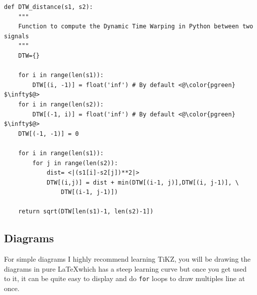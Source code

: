 \documentclass{project-logbook}
\begin{document}
\begin{lstlisting}[style=Python, linebackgroundcolor={
	\ifnum \value{lstnumber}=8 \color{orange!30} \fi
	\ifnum \value{lstnumber}=10 \color{orange!30} \fi
	\ifnum \value{lstnumber}=17 \color{orange!30}\fi
	\ifnum \value{lstnumber}=18 \color{orange!30}\fi}]
def DTW_distance(s1, s2):
	"""
	Function to compute the Dynamic Time Warping in Python between two signals
	"""
	DTW={}

	for i in range(len(s1)):
		DTW[(i, -1)] = float('inf') # By default <@\color{pgreen} $\infty$@>
	for i in range(len(s2)):
		DTW[(-1, i)] = float('inf') # By default <@\color{pgreen} $\infty$@>
	DTW[(-1, -1)] = 0

	for i in range(len(s1)):
		for j in range(len(s2)):
			dist= <|(s1[i]-s2[j])**2|>
			DTW[(i,j)] = dist + min(DTW[(i-1, j)],DTW[(i, j-1)], \
				DTW[(i-1, j-1)])

	return sqrt(DTW[len(s1)-1, len(s2)-1])
\end{lstlisting}

	\subsection{Diagrams} \label{sub:diagrams}
		\begin{HighlightedNote}{}
			For simple diagrams I highly recommend learning TiKZ, you will be drawing the diagrams in pure \LaTeX which has a steep learning curve but once you get used to it, it can be quite easy to display and do \texttt{for} loops to draw multiples line at once.
		\end{HighlightedNote}
\end{document}
